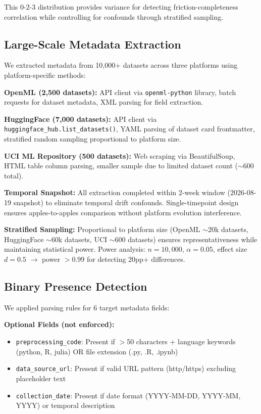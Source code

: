 This 0-2-3 distribution provides variance for detecting friction-completeness correlation while controlling for confounds through stratified sampling.

\subsection{Large-Scale Metadata Extraction}

We extracted metadata from 10,000+ datasets across three platforms using platform-specific methods:

\textbf{OpenML (2,500 datasets):} API client via \texttt{openml-python} library, batch requests for dataset metadata, XML parsing for field extraction.

\textbf{HuggingFace (7,000 datasets):} API client via \texttt{huggingface\_hub.list\_datasets()}, YAML parsing of dataset card frontmatter, stratified random sampling proportional to platform size.

\textbf{UCI ML Repository (500 datasets):} Web scraping via BeautifulSoup, HTML table column parsing, smaller sample due to limited dataset count ($\sim$600 total).

\textbf{Temporal Snapshot:} All extraction completed within 2-week window (2026-08-19 snapshot) to eliminate temporal drift confounds. Single-timepoint design ensures apples-to-apples comparison without platform evolution interference.

\textbf{Stratified Sampling:} Proportional to platform size (OpenML $\sim$20k datasets, HuggingFace $\sim$60k datasets, UCI $\sim$600 datasets) ensures representativeness while maintaining statistical power. Power analysis: $n=10{,}000$, $\alpha=0.05$, effect size $d=0.5$ $\rightarrow$ power $>0.99$ for detecting 20pp+ differences.

\subsection{Binary Presence Detection}

We applied parsing rules for 6 target metadata fields:

\textbf{Optional Fields (not enforced):}
\begin{itemize}
\item \texttt{preprocessing\_code}: Present if $>$50 characters + language keywords (python, R, julia) OR file extension (.py, .R, .ipynb)
\item \texttt{data\_source\_url}: Present if valid URL pattern (http/https) excluding placeholder text
\item \texttt{collection\_date}: Present if date format (YYYY-MM-DD, YYYY-MM, YYYY) or temporal description
\end{itemize}

